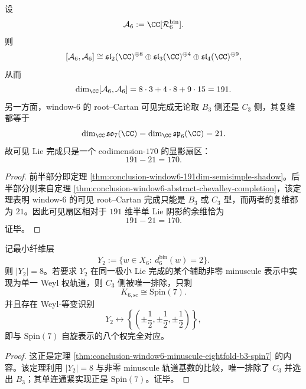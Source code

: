 \begin{theorem}\label{thm:conclusion-window6-visible-21dim-codim170-lie-shadow}
设
\[
\mathcal A_6:=\CC[\mathcal R_6^{\mathrm{bin}}].
\]
则
\[
[\mathcal A_6,\mathcal A_6]
\cong
\mathfrak{sl}_2(\CC)^{\oplus 8}
\oplus
\mathfrak{sl}_3(\CC)^{\oplus 4}
\oplus
\mathfrak{sl}_4(\CC)^{\oplus 9},
\]
从而
\[
\dim_{\CC}[\mathcal A_6,\mathcal A_6]
=
8\cdot 3+4\cdot 8+9\cdot 15
=191.
\]
另一方面，window-\(6\) 的 root--Cartan 可见完成无论取 \(B_3\) 侧还是 \(C_3\) 侧，其复维都等于
\[
\dim_{\CC}\mathfrak{so}_7(\CC)=\dim_{\CC}\mathfrak{sp}_6(\CC)=21.
\]
故可见 Lie 完成只是一个 codimension-\(170\) 的显影扇区：
\[
191-21=170.
\]
\end{theorem}
\begin{proof}
前半部分即定理 \ref{thm:conclusion-window6-191dim-semisimple-shadow}。后半部分则来自定理 \ref{thm:conclusion-window6-abstract-chevalley-completion}，该定理表明 window-\(6\) 的可见 root--Cartan 完成只能是 \(B_3\) 或 \(C_3\) 型，而两者的复维都为 \(21\)。因此可见扇区相对于 \(191\) 维半单 Lie 阴影的余维恰为
\[
191-21=170.
\]
证毕。
\end{proof}

\begin{theorem}\label{thm:conclusion-window6-eight-minimal-fibers-select-spin7}
记最小纤维层
\[
Y_2:=\{w\in X_6:\ d_6^{\mathrm{bin}}(w)=2\}.
\]
则 \(|Y_2|=8\)。若要求 \(Y_2\) 在同一极小 Lie 完成的某个辅助非零 minuscule 表示中实现为单一 Weyl 权轨道，则 \(C_3\) 侧被唯一排除，只剩
\[
K_{6,\mathrm{sc}}\cong \mathrm{Spin}(7).
\]
并且存在 Weyl-等变识别
\[
Y_2\longleftrightarrow
\left\{
\left(\pm\frac12,\pm\frac12,\pm\frac12\right)
\right\},
\]
即与 \(\mathrm{Spin}(7)\) 自旋表示的八个权完全对应。
\end{theorem}
\begin{proof}
这正是定理 \ref{thm:conclusion-window6-minuscule-eightfold-b3-spin7} 的内容。该定理利用 \(|Y_2|=8\) 与非零 minuscule 轨道基数的比较，唯一排除了 \(C_3\) 并选出 \(B_3\)；其单连通紧实现正是 \(\mathrm{Spin}(7)\)。证毕。
\end{proof}

